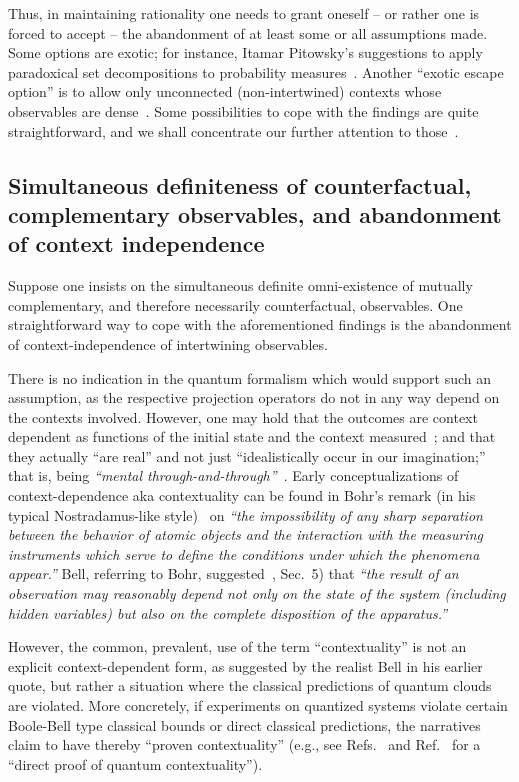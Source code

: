 \documentclass[%
  twocolumn,
 showpacs,
 showkeys,
 preprintnumbers,
 amsmath,amssymb,
 aps,
  pra,
  longbibliography,
 ]{revtex4-1}
\begin{document}
Thus, in maintaining rationality
one needs to
grant oneself -- or rather one is forced to accept -- the abandonment of at least some or all assumptions made.
Some options are exotic; for instance, Itamar Pitowsky's suggestions to apply paradoxical set decompositions
to probability measures~\citep{pitowsky-83,pitowsky-86}.
Another ``exotic escape option'' is to allow only unconnected (non-intertwined) contexts whose observables are dense~\citep{godsil-zaks,meyer:99,havlicek-2000}.
Some possibilities to cope with the findings are quite straightforward,
and we shall concentrate our further attention to those~\citep{svozil-2006-omni}.

\subsection{Simultaneous definiteness of counterfactual, complementary observables, and abandonment of context independence}

Suppose one insists on the simultaneous definite omni-existence of mutually complementary, and therefore necessarily counterfactual, observables.
One straightforward way to cope with the aforementioned findings is the abandonment of context-independence of intertwining observables.

There is no indication in the quantum formalism which would support such an assumption, as the respective projection operators do not
in any way depend on the contexts involved.
However, one may hold that the outcomes are context dependent
as functions of the initial state and the context measured~\citep{svozil:040102,svozil-2011-enough,Dzhafarov-2017};
and that they actually  ``are real''
and not just ``idealistically occur in our imagination;'' that is,
being
{\em ``mental through-and-through''}~\citep{Goldschmidt2017-idealism-Ch3}.
Early conceptualizations of context-dependence aka contextuality can be found in Bohr's
remark (in his typical Nostradamus-like style)~\citep{bohr-1949}
on {\em ``the impossibility of any sharp separation
between the behavior of atomic objects and the interaction with the measuring instruments which serve to define
the conditions under which the phenomena appear.''}
Bell, referring to Bohr, suggested~\citep{bell-66}, Sec.~5) that
{\em ``the result of an observation may
reasonably depend not only on the state of the system
(including hidden variables) but also on the complete
disposition of the apparatus.''}

However, the common, prevalent, use of the term ``contextuality''
is not an explicit context-dependent form, as suggested by the realist Bell in his earlier quote,
but rather a situation where the classical predictions of quantum clouds are violated. More concretely,
if experiments on quantized systems violate certain Boole-Bell type classical bounds or direct
classical predictions,
the narratives claim to have thereby ``proven contextuality''
(e.g., see Refs.~\citep{hasegawa:230401,cabelloFilipp-2008,cabello:210401,Bartosik-09,PhysRevLett.103.160405,Bub-2010}
and Ref.~\citep{Cabello-2013-Hardylike} for a ``direct proof of quantum contextuality'').
\end{document}
